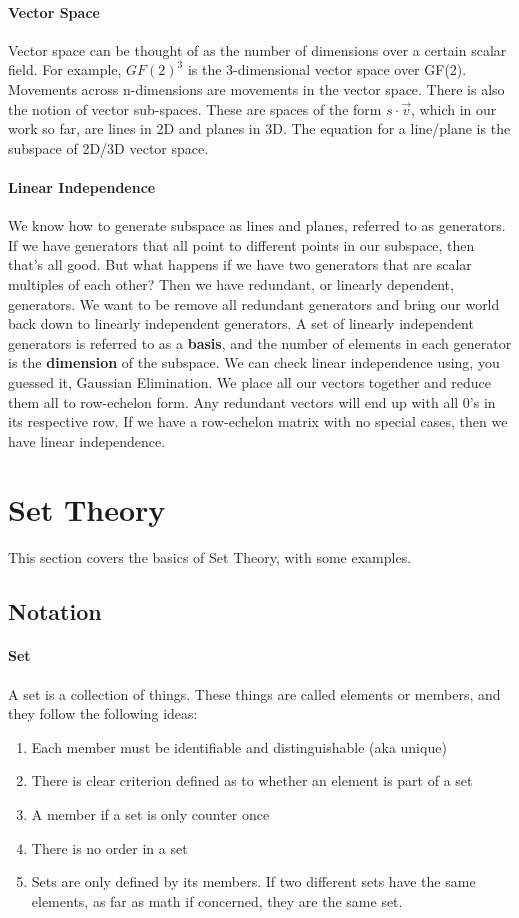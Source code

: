\paragraph{Vector Space} Vector space can be thought of as the number of dimensions over a certain scalar field. For example, $GF(2)^{3}$ is the 3-dimensional vector space over GF(2). Movements across n-dimensions are movements in the vector space. There is also the notion of vector sub-spaces. These are spaces of the form $s \cdot \vec{v}$, which in our work so far, are lines in 2D and planes in 3D. The equation for a line/plane is the subspace of 2D/3D vector space.
\paragraph{Linear Independence} We know how to generate subspace as lines and planes, referred to as generators. If we have generators that all point to different points in our subspace, then that's all good. But what happens if we have two generators that are scalar multiples of each other? Then we have redundant, or linearly dependent, generators. We want to be remove all redundant generators and bring our world back down to linearly independent generators. A set of linearly independent generators is referred to as a \textbf{basis}, and the number of elements in each generator is the \textbf{dimension} of the subspace. \newline
We can check linear independence using, you guessed it, Gaussian Elimination. We place all our vectors together and reduce them all to row-echelon form. Any redundant vectors will end up with all 0's in its respective row. If we have a row-echelon matrix with no special cases, then we have linear independence.

\section{Set Theory}
This section covers the basics of Set Theory, with some examples.
\subsection{Notation}
\paragraph{Set} A set is a collection of things. These things are called elements or members, and they follow the following ideas:
\begin{enumerate}
	\item Each member must be identifiable and distinguishable (aka unique)
	\item There is clear criterion defined as to whether an element is part of a set
	\item A member if a set is only counter once
	\item There is no order in a set
	\item Sets are only defined by its members. If two different sets have the same elements, as far as math if concerned, they are the same set.
\end{enumerate}

